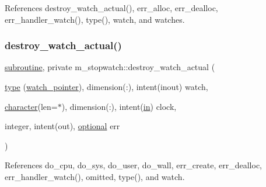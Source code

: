References destroy\+\_\+watch\+\_\+actual(), err\+\_\+alloc, err\+\_\+dealloc, err\+\_\+handler\+\_\+watch(), type(), watch, and watches.

\mbox{\label{namespacem__stopwatch_a04d101b90fcf3f9678604f95f9768a63}} 
\subsubsection{\texorpdfstring{destroy\+\_\+watch\+\_\+actual()}{destroy\_watch\_actual()}}
{\footnotesize\ttfamily \hyperlink{M__stopwatch_83_8txt_acfbcff50169d691ff02d4a123ed70482}{subroutine}, private m\+\_\+stopwatch\+::destroy\+\_\+watch\+\_\+actual (\begin{DoxyParamCaption}\item[{\hyperlink{stop__watch_83_8txt_a70f0ead91c32e25323c03265aa302c1c}{type} (\hyperlink{structm__stopwatch_1_1watch__pointer}{watch\+\_\+pointer}), dimension(\+:), intent(inout)}]{watch,  }\item[{\hyperlink{option__stopwatch_83_8txt_abd4b21fbbd175834027b5224bfe97e66}{character}(len=$\ast$), dimension(\+:), intent(\hyperlink{M__journal_83_8txt_afce72651d1eed785a2132bee863b2f38}{in})}]{clock,  }\item[{integer, intent(out), \hyperlink{option__stopwatch_83_8txt_aa4ece75e7acf58a4843f70fe18c3ade5}{optional}}]{err }\end{DoxyParamCaption})\hspace{0.3cm}{\ttfamily [private]}}



References do\+\_\+cpu, do\+\_\+sys, do\+\_\+user, do\+\_\+wall, err\+\_\+create, err\+\_\+dealloc, err\+\_\+handler\+\_\+watch(), omitted, type(), and watch.

\mbox{\label{namespacem__stopwatch_a96a4051d4baf7bd447bc16c0b47983d4}} 
